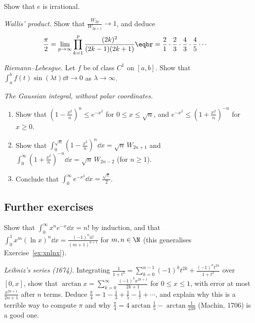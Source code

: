 \begin{exercise}[$\star\star$]\label{ex:eirr}
Show that $e$ is irrational.
\end{exercise}

\begin{exercise}[$\star\star$]\label{ex:wallisprod}
\emph{Wallis' product.} Show that $\displaystyle\frac{W_{2p}}{W_{2p+1}}\to1$, and deduce
\[
\begin{aligned}\frac\pi2&=\lim_{p\to\infty}\prod_{k=1}^p\frac{(2k)^2}{(2k-1)(2k+1)}\eqbr=\frac21\cdot\frac23\cdot\frac43\cdot\frac45\cdots\end{aligned}
\]
\end{exercise}

\begin{exercise}[$\star\star$]\label{ex:rl}
\emph{Riemann--Lebesgue.} Let $f$ be of class $C^1$ on $[a,b]$. Show that $\displaystyle\int_a^bf(t)\sin(\lambda t)\dd t\to0$ as $\lambda\to\infty$.
\end{exercise}

\begin{exercise}[$\star\star\star$]\label{ex:gaussian}
\emph{The Gaussian integral, without polar coordinates.}
\begin{enumerate}[label=(\alph*)]
\item Show that $\left(1-\frac{x^2}n\right)^n\le e^{-x^2}$ for $0\le x\le\sqrt n$, and $e^{-x^2}\le\left(1+\frac{x^2}n\right)^{-n}$ for $x\ge0$.
\item Show that $\int_0^{\sqrt n}\left(1-\frac{x^2}n\right)^n\dd x=\sqrt n\,W_{2n+1}$ and $\int_0^\infty\left(1+\frac{x^2}n\right)^{-n}\dd x=\sqrt n\,W_{2n-2}$ (for $n\ge1$).
\item Conclude that $\displaystyle\int_0^\infty e^{-x^2}\dd x=\frac{\sqrt\pi}2$.
\end{enumerate}
\end{exercise}

\subsection*{Further exercises}

\begin{exercise}[$\star$]\label{ex:xnex}
Show that $\displaystyle\int_0^\infty x^ne^{-x}\dd x=n!$ by induction, and that $\displaystyle\int_0^1x^m(\ln x)^n\dd x=\frac{(-1)^nn!}{(m+1)^{n+1}}$ for $m,n\in\N$ (this generalises Exercise~\ref{ex:xnlnx}).
\end{exercise}

\begin{exercise}[$\star$]\label{ex:leibnizpi}
\emph{Leibniz's series (1674).} Integrating $\frac1{1+t^2}=\sum_{k=0}^{n-1}(-1)^kt^{2k}+\frac{(-1)^nt^{2n}}{1+t^2}$ over $[0,x]$, show that $\arctan x=\sum_{k=0}^\infty\frac{(-1)^kx^{2k+1}}{2k+1}$ for $0\le x\le1$, with error at most $\frac{x^{2n+1}}{2n+1}$ after $n$ terms. Deduce $\frac\pi4=1-\frac13+\frac15-\frac17+\cdots$, and explain why this is a terrible way to compute $\pi$ and why $\frac\pi4=4\arctan\frac15-\arctan\frac1{239}$ (Machin, 1706) is a good one.
\end{exercise}

